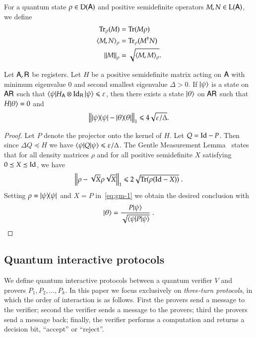 For a quantum state $\rho \in \mathrm{D}({\mathsf{A}})$ and positive semidefinite operators $M,N \in \mathrm{L}({\mathsf{A}})$, we define 
\begin{align}
	\operatorname{Tr}_\rho(M) &= \operatorname{Tr}(M \rho) \\
	\langle M, N \rangle_\rho &= \operatorname{Tr}_\rho (M^\dagger N) \\
	\left\lVert M \right\rVert_\rho & = \sqrt{ \langle M, M \rangle_\rho}.
\end{align}

\begin{lemma}
\label{lem:closeness_to_groundspace}
	Let ${\mathsf{A}}, {\mathsf{R}}$ be registers. Let $H$ be a positive semidefinite matrix acting on ${\mathsf{A}}$ with minimum eigenvalue $0$ and second smallest eigenvalue $\Delta > 0$. If $|\psi\rangle$ is a state on ${\mathsf{A}} {\mathsf{R}}$ such that $\langle\psi| H_{{\mathsf{A}}} \otimes \mathop{\mathrm{Id}}\!\mathinner{}_{{\mathsf{R}}} |\psi\rangle \leqslant \varepsilon$, then there exists a state $|\theta\rangle$ on ${\mathsf{A}} {\mathsf{R}}$ such that $H |\theta\rangle = 0$ and
	\[
		\left \| |\psi\rangle\! \langle \psi| - |\theta\rangle\! \langle \theta| \right \|_1 \leqslant 4\sqrt{\varepsilon/\Delta}.
	\]
\end{lemma}
\begin{proof}
	Let $P$ denote the projector onto the kernel of $H$. Let $Q = \mathop{\mathrm{Id}}\!\mathinner{} - P$. Then since $\Delta Q \preceq H$ we have $\langle\psi| Q |\psi\rangle \leqslant \varepsilon/\Delta$. The Gentle Measurement Lemma~\cite{ogawa2002new} states that for all density matrices $\rho$ and for all positive semidefinite $X$ satisfying $0 \preceq X \preceq \mathop{\mathrm{Id}}\!\mathinner{}$, we have
	\begin{equation}\label{eq:gm-1}
		\left \| \rho - \sqrt{X}\rho \sqrt{X}  \right \|_1 \leq 2 \sqrt{ \Tr(\rho (\Id - X))}\;.
	\end{equation}
	Setting $\rho = |\psi\rangle\! \langle \psi|$ and $X = P$ in~\eqref{eq:gm-1} we obtain the desired conclusion with
	\[
		|\theta\rangle = \frac{ P |\psi\rangle}{\sqrt{ \langle\psi| P |\psi\rangle}}\;.
	\]
\end{proof}

\subsection{Quantum interactive protocols} 

We define quantum interactive protocols between a quantum verifier $V$ and provers $P_1,P_2,\ldots,P_k$. In this paper we focus exclusively on \emph{three-turn protocols}, in which the order of interaction is as follows. First the provers send a message to the verifier; second the verifier sends a message to the provers; third the provers send a message back; finally, the verifier performs a computation and returns a decision bit,  ``accept'' or ``reject''. 

